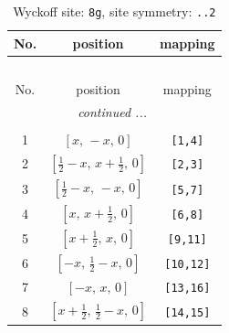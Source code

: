\documentclass[fleqn,8pt]{jsarticle}
\begin{document}
\renewcommand{\arraystretch}{1.2}
\begin{longtable}{ccc}
\caption{Wyckoff site: {\tt 8g}, site symmetry: {\tt ..2}}
 \\
 \hline \hline
No. & position & mapping \\ \hline \endfirsthead

\multicolumn{2}{l}{\tablename\ \thetable{}} \\
 \hline \hline
No. & position & mapping \\ \hline \endhead

 \hline \hline
\multicolumn{2}{r}{\footnotesize\it continued ...} \\ \endfoot

 \hline \hline
\multicolumn{2}{r}{} \\ \endlastfoot

1 & $\left[ x,\, - x,\, 0 \right]$ & {\tt [1,4]} \\ \hline
2 & $\left[ \frac{1}{2} - x,\, x + \frac{1}{2},\, 0 \right]$ & {\tt [2,3]} \\ \hline
3 & $\left[ \frac{1}{2} - x,\, - x,\, 0 \right]$ & {\tt [5,7]} \\ \hline
4 & $\left[ x,\, x + \frac{1}{2},\, 0 \right]$ & {\tt [6,8]} \\ \hline
5 & $\left[ x + \frac{1}{2},\, x,\, 0 \right]$ & {\tt [9,11]} \\ \hline
6 & $\left[ - x,\, \frac{1}{2} - x,\, 0 \right]$ & {\tt [10,12]} \\ \hline
7 & $\left[ - x,\, x,\, 0 \right]$ & {\tt [13,16]} \\ \hline
8 & $\left[ x + \frac{1}{2},\, \frac{1}{2} - x,\, 0 \right]$ & {\tt [14,15]} \\
\end{longtable}
\renewcommand{\arraystretch}{1.2}
\end{document}
